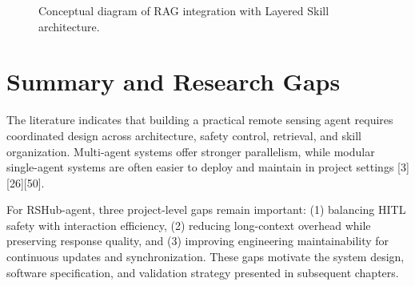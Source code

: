 {	\begin{figure}[h!]
		\centering
		\caption{Conceptual diagram of RAG integration with Layered Skill architecture.}
		\label{fig:rag-layered-tikz-vertical}
	\end{figure}
	
	\section{Summary and Research Gaps}
	
	The literature indicates that building a practical remote sensing agent requires coordinated design across architecture, safety control, retrieval, and skill organization. Multi-agent systems offer stronger parallelism, while modular single-agent systems are often easier to deploy and maintain in project settings [3][26][50].
	
	For RSHub-agent, three project-level gaps remain important: (1) balancing HITL safety with interaction efficiency, (2) reducing long-context overhead while preserving response quality, and (3) improving engineering maintainability for continuous updates and synchronization. These gaps motivate the system design, software specification, and validation strategy presented in subsequent chapters.
	
}